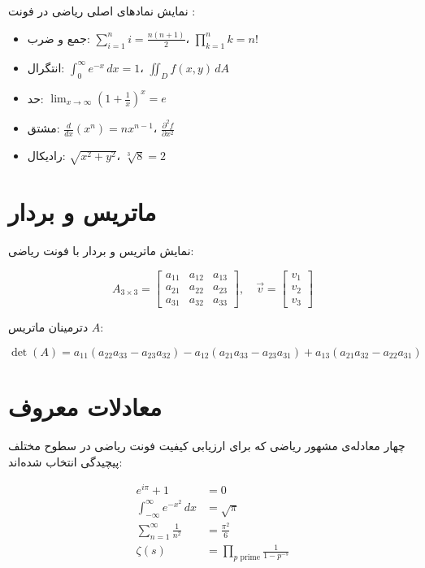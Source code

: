 \documentclass{matinbook}
\begin{document}
نمایش نمادهای اصلی ریاضی در فونت :

\begin{itemize}
    \item جمع و ضرب: $\sum_{i=1}^{n} i = \frac{n(n+1)}{2}$،
          $\prod_{k=1}^{n} k = n!$
    \item انتگرال: $\int_{0}^{\infty} e^{-x} \,dx = 1$،
          $\iint_{D} f(x,y) \,dA$
    \item حد: $\lim_{x \to \infty} (1 + \frac{1}{x})^{x} = e$
    \item مشتق: $\frac{d}{dx}(x^{n}) = nx^{n-1}$،
          $\frac{\partial^{2}f}{\partial x^{2}}$
    \item رادیکال: $\sqrt{x^{2}+y^{2}}$،
          $\sqrt[3]{8} = 2$
\end{itemize}

\section{ماتریس و بردار}
\label{sec:font-math-matrices}

نمایش ماتریس و بردار با فونت ریاضی:

\[
A_{3 \times 3} =
\begin{bmatrix}
    a_{11} & a_{12} & a_{13} \\
    a_{21} & a_{22} & a_{23} \\
    a_{31} & a_{32} & a_{33}
\end{bmatrix}, \quad
\vec{v} = \begin{bmatrix} v_{1} \\ v_{2} \\ v_{3} \end{bmatrix}
\]

دترمینان ماتریس $A$:

\[
\det(A) = a_{11}(a_{22}a_{33} - a_{23}a_{32})
        - a_{12}(a_{21}a_{33} - a_{23}a_{31})
        + a_{13}(a_{21}a_{32} - a_{22}a_{31})
\]

\section{معادلات معروف}
\label{sec:font-math-famous}

چهار معادله‌ی مشهور ریاضی که برای ارزیابی کیفیت فونت
ریاضی در سطوح مختلف پیچیدگی انتخاب شده‌اند:

\begin{align}
    e^{i\pi} + 1 &= 0 \label{eq:euler} \\
    \int_{-\infty}^{\infty} e^{-x^{2}} \,dx &= \sqrt{\pi} \label{eq:gaussian} \\
    \sum_{n=1}^{\infty} \frac{1}{n^{2}} &= \frac{\pi^{2}}{6} \label{eq:basel} \\
    \zeta(s) &= \prod_{p \text{ prime}} \frac{1}{1 - p^{-s}} \label{eq:euler-product}
\end{align}
\end{document}
